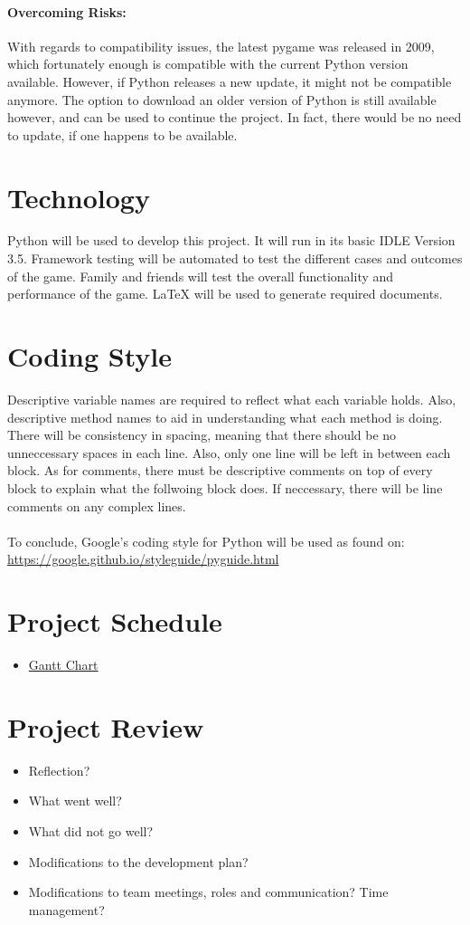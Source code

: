 \documentclass{article}
\begin{document}
\paragraph{Overcoming Risks:}
With regards to compatibility issues, the latest pygame was released in 2009, which fortunately enough is compatible with the current Python version available. However, if Python releases a new update, it might not be compatible anymore. The option to download an older version of Python is still available however, and can be used to continue the project. In fact, there would be no need to update, if one happens to be available.

\section{Technology}
Python will be used to develop this project. It will run in its basic IDLE Version 3.5. Framework testing will be automated to test the different cases and outcomes of the game. Family and friends will test the overall functionality and performance of the game. LaTeX will be used to generate required documents.

\section{Coding Style}
Descriptive variable names are required to reflect what each variable holds. Also, descriptive method names to aid in understanding what each method is doing. There will be consistency in spacing, meaning that there should be no unneccessary spaces in each line. Also, only one line will be left in between each block. As for comments, there must be descriptive comments on top of every block to explain what the follwoing block does. If neccessary, there will be line comments on any complex lines.\\
\\
To conclude, Google's coding style for Python will be used as found on: \url{https://google.github.io/styleguide/pyguide.html}

\section{Project Schedule}

\begin{itemize}

\item \href{run:GanttChart.gan} {Gantt Chart}\\

\end{itemize}
\section{Project Review}
\begin{itemize}
\item Reflection?
\item What went well?
\item  What did not go well?
\item Modifications to the development plan?
\item Modifications to team meetings, roles and communication? Time management?
\end{itemize}
\end{document}
